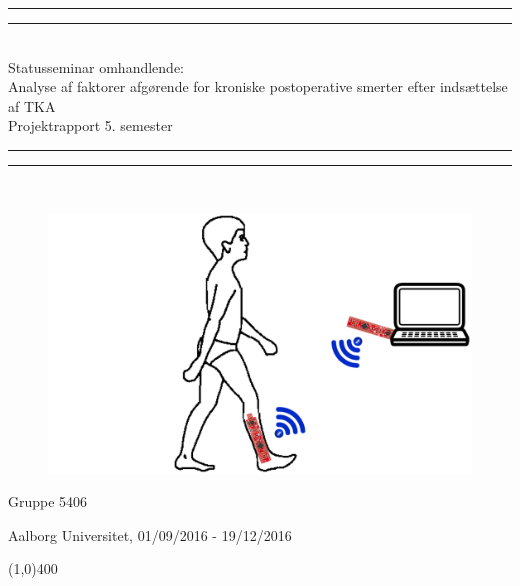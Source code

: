 \begin{center}
	\vspace*{\baselineskip}
	\rule{\textwidth}{1.6pt}\vspace*{-\baselineskip}\vspace*{2pt} %
	\rule{\textwidth}{0.4pt}\\[\baselineskip] %
	
	{\huge  Statusseminar omhandlende: \\\hspace*{2ex} Analyse af faktorer afgørende for kroniske postoperative smerter efter indsættelse af TKA\\[0.5\baselineskip] \large Projektrapport 5. semester}\\[0.2\baselineskip] %
	
	\rule{\textwidth}{0.4pt}\vspace*{-\baselineskip}\vspace{3.2pt} %
	\rule{\textwidth}{1.6pt}\\[\baselineskip] %
	\vspace*{5\baselineskip}
	\begin{figure}[H]
		\centering
		\begin{minipage}[c]{1\textwidth}
			\includegraphics[width=.75\textwidth]{figures/forside2.PNG}
		\end{minipage}
		\hfill
	\end{figure}
	\vspace*{\fill}
	\scshape %
	{\Large Gruppe 5406\par}
	
	\vspace*{.8\baselineskip} %
	
	Aalborg Universitet,  01/09/2016 - 19/12/2016 \par %
\end{center} %

\begin{center}
	\line(1,0){400}
\end{center}